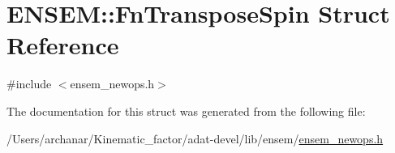 \hypertarget{structENSEM_1_1FnTransposeSpin}{}\section{E\+N\+S\+EM\+:\+:Fn\+Transpose\+Spin Struct Reference}
\label{structENSEM_1_1FnTransposeSpin}


{\ttfamily \#include $<$ensem\+\_\+newops.\+h$>$}



The documentation for this struct was generated from the following file\+:\begin{DoxyCompactItemize}
\item 
/\+Users/archanar/\+Kinematic\+\_\+factor/adat-\/devel/lib/ensem/\mbox{\hyperlink{adat-devel_2lib_2ensem_2ensem__newops_8h}{ensem\+\_\+newops.\+h}}\end{DoxyCompactItemize}
